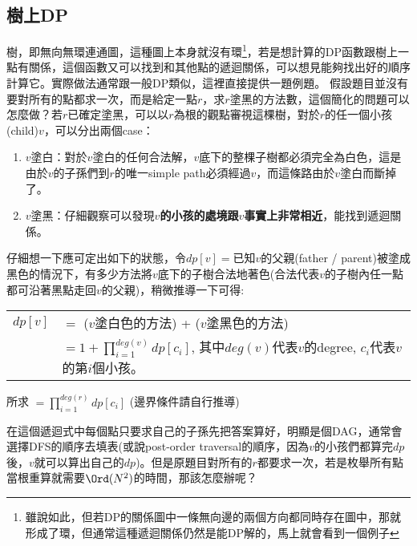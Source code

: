 \subsection{樹上DP}
\label{sec:dp2:theory:dp_on_tree}
樹，即無向無環連通圖，這種圖上本身就沒有環\footnote{雖說如此，但若DP的關係圖中一條無向邊的兩個方向都同時存在圖中，那就形成了環，但通常這種遞迴關係仍然是能DP解的，馬上就會看到一個例子}，若是想計算的DP函數跟樹上一點有關係，這個函數又可以找到和其他點的遞迴關係，可以想見能夠找出好的順序計算它。實際做法通常跟一般DP類似，這裡直接提供一題例題。
假設題目並沒有要對所有的點都求一次，而是給定一點$r$，求$r$塗黑的方法數，這個簡化的問題可以怎麼做？若$r$已確定塗黑，可以以$r$為根的觀點審視這棵樹，對於$r$的任一個小孩(child)$v$，可以分出兩個case：
\begin{enumerate}
\item $v$塗白：對於$v$塗白的任何合法解，$v$底下的整棵子樹都必須完全為白色，這是由於$v$的子孫們到$r$的唯一simple path必須經過$v$，而這條路由於$v$塗白而斷掉了。
\item $v$塗黑：仔細觀察可以發現\textbf{$v$的小孩的處境跟$v$事實上非常相近}，能找到遞迴關係。
\end{enumerate}
仔細想一下應可定出如下的狀態，令$dp[v] = $已知$v$的父親(father / parent)被塗成黑色的情況下，有多少方法將$v$底下的子樹合法地著色(合法代表$v$的子樹內任一點都可沿著黑點走回$v$的父親)，稍微推導一下可得:

\begin{tabular}{rl}
$dp[v]$&$=$ ($v$塗白色的方法) + ($v$塗黑色的方法) \\
      & $= 1 + \prod_{i=1}^{deg(v)}{dp[c_i]}$, 其中$deg(v)$代表$v$的degree, $c_i$代表$v$的第$i$個小孩。
\end{tabular}


所求 $= \prod_{i=1}^{deg(r)}{dp[c_i]}$ (邊界條件請自行推導)

在這個遞迴式中每個點只要求自己的子孫先把答案算好，明顯是個DAG，通常會選擇DFS的順序去填表(或說post-order traversal的順序，因為$v$的小孩們都算完$dp$後，$v$就可以算出自己的$dp$)。但是原題目對所有的$r$都要求一次，若是枚舉所有點當根重算就需要$\Ord(N^2)$的時間，那該怎麼辦呢？

